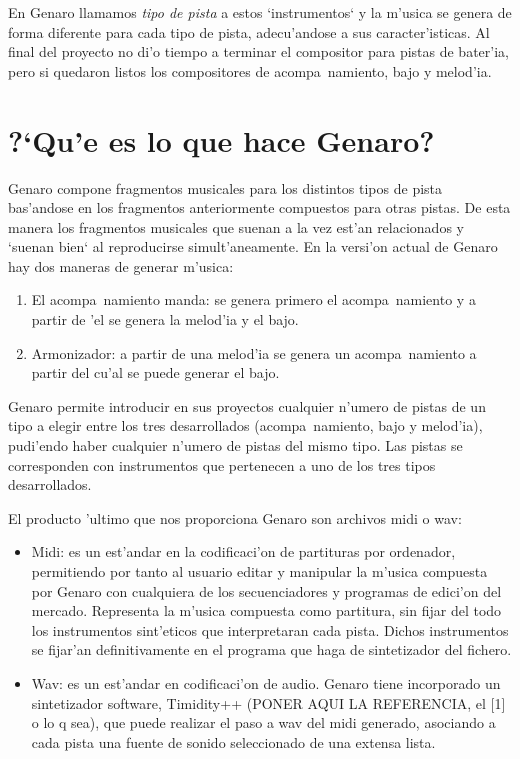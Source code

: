 ﻿\documentclass[a4paper,12pt]{article}
\begin{document}
En Genaro llamamos \emph{tipo de pista} a estos `instrumentos` y la m'usica se genera de forma diferente para cada tipo de pista, adecu'andose a sus caracter'isticas. Al final del proyecto no di'o tiempo a terminar el compositor para pistas de bater'ia, pero si quedaron listos los compositores de acompa~namiento, bajo y melod'ia.

\section{?`Qu'e es lo que hace Genaro?}
Genaro compone fragmentos musicales para los distintos tipos de pista bas'andose en los fragmentos anteriormente compuestos para otras pistas. De esta manera los fragmentos musicales que suenan a la vez est'an relacionados y `suenan bien` al reproducirse simult'aneamente. En la versi'on actual de Genaro hay dos maneras de generar m'usica:
\begin{enumerate}
\item El acompa~namiento manda: se genera primero el acompa~namiento y a partir de 'el se genera la melod'ia y el bajo.
\item Armonizador: a partir de una melod'ia se genera un acompa~namiento a partir del cu'al se puede generar el bajo.
\end{enumerate}

Genaro permite introducir en sus proyectos cualquier n'umero de pistas de un tipo a elegir entre los tres desarrollados (acompa~namiento, bajo y melod'ia), pudi'endo haber cualquier n'umero de pistas del mismo tipo. Las pistas se corresponden con instrumentos que pertenecen a uno de los tres tipos desarrollados.

El producto 'ultimo que nos proporciona Genaro son archivos midi o wav:
\begin{itemize}
\item Midi: es un est'andar en la codificaci'on de partituras por ordenador, permitiendo por tanto al usuario editar y manipular la m'usica compuesta por Genaro con cualquiera de los secuenciadores y programas de edici'on del mercado. Representa la m'usica compuesta como partitura, sin fijar del todo los instrumentos sint'eticos que interpretaran cada pista. Dichos instrumentos se fijar'an definitivamente en el programa que haga de sintetizador del fichero.
\item Wav: es un est'andar en codificaci'on de audio. Genaro tiene incorporado un sintetizador software, Timidity++ (PONER AQUI LA REFERENCIA, el [1] o lo q sea), que puede realizar el paso a wav del midi generado, asociando a cada pista una fuente de sonido seleccionado de una extensa lista.
\end{itemize}
\end{document}

